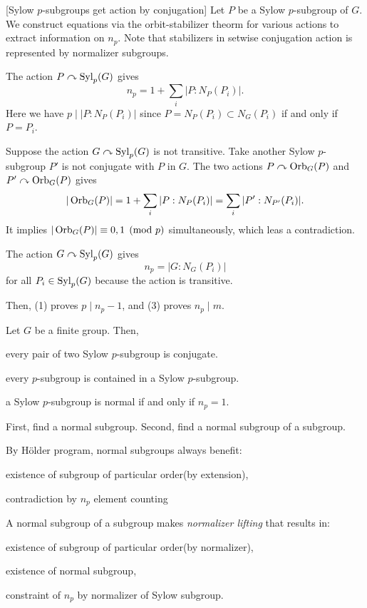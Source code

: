 \documentclass{../exp}
\begin{document}
\begin{pf}
\bigskip
{}[Sylow $p$-subgroups get action by conjugation]
Let $P$ be a Sylow $p$-subgroup of $G$.
We construct equations via the orbit-stabilizer theorm for various actions to extract information on $n_p$.
Note that stabilizers in setwise conjugation action is represented by normalizer subgroups.
\begin{cond}
\item The action $P\curvearrowright\operatorname{Syl}_p(G)$ gives
\[n_p=1+\sum_i|P:N_P(P_i)|.\]
Here we have $p\mid |P:N_P(P_i)|$ since $P=N_P(P_i)\subset N_G(P_i)$ if and only if $P=P_i$.
\item Suppose the action $G\curvearrowright\operatorname{Syl}_p(G)$ is not transitive.
Take another Sylow $p$-subgroup $P'$ is not conjugate with $P$ in $G$.
The two actions $P\curvearrowright\operatorname{Orb}_G(P)$ and $P'\curvearrowright\operatorname{Orb}_G(P)$ gives
\[|\operatorname{Orb}_G(P)|=1+\sum_i|P:N_P(P_i)|=\sum_i|P':N_{P'}(P_i)|.\]
It implies $|\operatorname{Orb}_G(P)|\equiv0,1\pmod{p}$ simultaneously, which leas a contradiction.
\item The action $G\curvearrowright\operatorname{Syl}_p(G)$ gives
\[n_p=|G:N_G(P_i)|\]
for all $P_i\in\operatorname{Syl}_p(G)$ because the action is transitive.
\end{cond}
Then, (1) proves $p\mid n_p-1$, and (3) proves $n_p\mid m$.
\end{pf}

\begin{cor}
Let $G$ be a finite group.
Then,
\begin{cond}
\item every pair of two Sylow $p$-subgroup is conjugate.
\item every $p$-subgroup is contained in a Sylow $p$-subgroup.
\item a Sylow $p$-subgroup is normal if and only if $n_p=1$.
\end{cond}
\end{cor}


First, find a normal subgroup.
Second, find a normal subgroup of a subgroup.

By H\"older program, normal subgroups always benefit:
\begin{cond}
\item existence of subgroup of particular order(by extension),
\item contradiction by $n_p$ element counting
\end{cond}
A normal subgroup of a subgroup makes \emph{normalizer lifting} that results in:
\begin{cond}
\item existence of subgroup of particular order(by normalizer),
\item existence of normal subgroup,
\item constraint of $n_p$ by normalizer of Sylow subgroup.
\end{cond}
\end{document}
